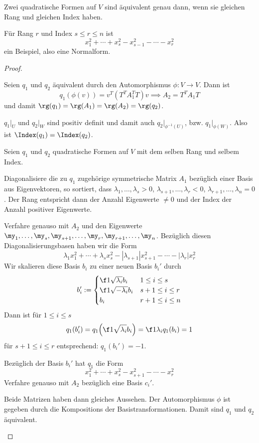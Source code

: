 \documentclass{mycourse}
\begin{document}
\begin{thm}
	\label{thm:15.10}
	Zwei quadratische Formen auf $V$ sind äquivalent genau dann, wenn sie gleichen Rang und gleichen Index haben.
	\begin{note}
		Für Rang $r$ und Index $s \le r \le n$ ist
		\[
			x_1^2 + \dotsb + x_s^2 - x_{s-1}^2 - \dotsb - x_r^2
		\]
		ein Beispiel, also eine Normalform.
	\end{note}
	\begin{proof}
		\begin{seg}[„$\Longrightarrow$“]
			Seien $q_1$ und $q_2$ äquivalent durch den Automorphismus $\phi: V \to V$.
			Dann ist
			\[
				q_1(\phi(v)) = v^T(T^TA_1^TT)v  \implies A_2 = T^TA_1T
			\]
			und damit $\rg(q_1) = \rg(A_1) = \rg(A_2) = \rg(q_2)$.
			
			$q_1|_U$ und $q_2|_W$ sind positiv definit und damit auch $q_2|_{\phi^{-1}(U)}$, bzw. $q_1|_{\phi(W)}$.
			Also ist $\Index(q_1) = \Index(q_2)$.
		\end{seg}
		\begin{seg}[„$\Longleftarrow$“]
			Seien $q_1$ und $q_2$ quadratische Formen auf $V$ mit dem selben Rang und selbem Index.

			Diagonalisiere die zu $q_1$ zugehörige symmetrische Matrix $A_1$ bezüglich einer Basis aus Eigenvektoren, so sortiert, dass $\lambda_1, \dotsc, \lambda_s > 0$, $\lambda_{s+1},\dotsc,\lambda_r < 0$, $\lambda_{r+1},\dotsc,\lambda_n = 0$.
			Der Rang entspricht dann der Anzahl Eigenwerte $\neq 0$ und der Index der Anzahl positiver Eigenwerte.

			Verfahre genauso mit $A_2$ und den Eigenwerte $\my_1,\dotsc,\my_s,\my_{s+1},\dotsc,\my_{r},\my_{r+1},\dotsc,\my_{n}$.
			Bezüglich diesen Diagonalisierungsbasen haben wir die Form
			\[
				\lambda_1x_1^2 + \dotsb + \lambda_sx_s^2 - |\lambda_{s+1}|x_{s+1}^2 - \dotsb - |\lambda_r|x_r^2
			\]
			Wir skalieren diese Basis $b_i$ zu einer neuen Basis $b_i'$ durch
			\[
				b_i' := \begin{cases} \f 1{\sqrt{\lambda_i}}b_i & 1\le i \le s\\
					\f 1{\sqrt{-\lambda_i}} b_i & s+1\le i\le r\\
					b_i & r+1 \le i \le n
				\end{cases}
			\]
			Dann ist für $1\le i \le s$
			\[
				q_1(b_i') =  q_1\Big( \f 1{\sqrt{\lambda_i}} b_i\Big) = \f 1{\lambda_i} q_1(b_i) = 1
			\]
			für $s+1\le i \le r$ entsprechend: $q_1(b_i') = -1$.

			Bezüglich der Basis $b_i'$ hat $q_1$ die Form
			\[
				x_1^2 + \dotsb + x_s^2 - x_{s+1}^2 - \dotsb - x_r^2
			\]
			Verfahre genauso mit $A_2$ bezüglich eine Basis $c_i'$.

			Beide Matrizen haben dann gleiches Aussehen.
			Der Automorphismus $\phi$ ist gegeben durch die Kompositions der Basistransformationen.
			Damit sind $q_1$ und $q_2$ äquivalent.
		\end{seg}
	\end{proof}
\end{thm}
\end{document}
